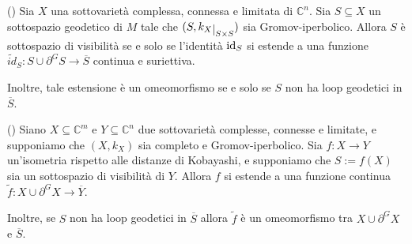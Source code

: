 \begin{thm}
    (\cite[Theorem 1.4]{CMS}) Sia $X$ una sottovarietà complessa, connessa e limitata di $\mathbb{C}^n$. Sia $S\subseteq X$ un sottospazio geodetico di $M$ tale che $(S,k_X\restrict{S\times S})$ sia Gromov-iperbolico. Allora $S$ è sottospazio di visibilità se e solo se l'identità $\operatorname{id}_S$ si estende a una funzione $\tilde{id}_S:S\cup\partial^GS\longrightarrow\overline{S}$ continua e suriettiva.

    Inoltre, tale estensione è un omeomorfismo se e solo se $S$ non ha loop geodetici in $\overline{S}$.
\end{thm}

\begin{thm}
    (\cite[Theorem 1.5]{CMS}) Siano $X\subseteq\mathbb{C}^m$ e $Y\subseteq\mathbb{C}^n$ due sottovarietà complesse, connesse e limitate, e supponiamo che $(X,k_X)$ sia completo e Gromov-iperbolico. Sia $f:X\longrightarrow Y$ un'isometria rispetto alle distanze di Kobayashi, e supponiamo che $S:=f(X)$ sia un sottospazio di visibilità di $Y$. Allora $f$ si estende a una funzione continua $\tilde{f}:X\cup\partial^GX\longrightarrow\overline{Y}$.

    Inoltre, se $S$ non ha loop geodetici in $\overline{S}$ allora $\tilde{f}$ è un omeomorfismo tra $X\cup\partial^GX$ e $\overline{S}$.
\end{thm}